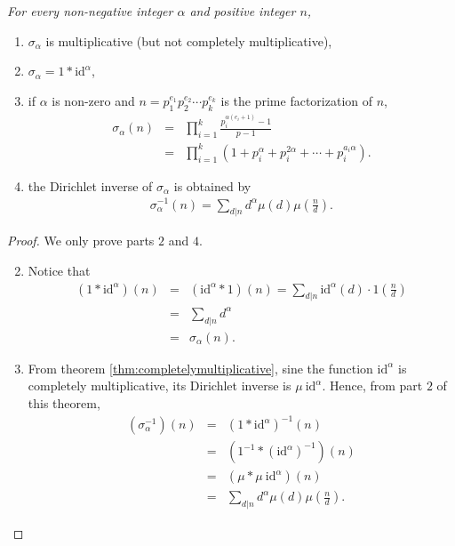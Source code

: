 \documentclass[12pt]{subfile}
\begin{document}
	\begin{theorem}\slshape
		For every non-negative integer $\alpha$ and positive integer $n$,
			\begin{enumerate}
				\item $\sigma_\alpha$ is multiplicative (but not completely multiplicative),
				\item $\sigma_\alpha = 1 \ast \text{id}^\alpha$,
				\item if $\alpha$ is non-zero and $n=p_1^{e_1}p_2^{e_2}\cdots p_k^{e_k}$ is the prime factorization of $n$,
					\begin{eqnarray*}
						\sigma_\alpha(n) &=& \prod_{i=1}^{k} \frac{p_i^{\alpha(e_i+1)}-1}{p-1}\\
									 &=& \prod_{i=1}^k \left(1 + p_i^\alpha + p_i^{2\alpha} + \cdots + p_i^{a_i \alpha}\right). 
					\end{eqnarray*}
				\item the Dirichlet inverse of $\sigma_\alpha$ is obtained by
					\begin{align*}
						\sigma_\alpha^{-1} (n) = \sum_{d|n} d^\alpha\mu(d) \mu\left(\frac{n}{d}\right).
					\end{align*}
			\end{enumerate}
	\end{theorem}
	
	\begin{proof}
		We only prove parts $2$ and $4$.
			\begin{enumerate} \setcounter{enumi}{1}
				\item Notice that
					\begin{eqnarray*}
						(1 \ast \text{id}^\alpha)(n) 
							&=& ( \text{id}^\alpha\ast 1)(n) = \sum_{d|n} \text{id}^\alpha (d) \cdot 1\left(\frac{n}{d}\right)\\
							&=& \sum_{d|n} d^\alpha \\
							&=& \sigma_\alpha (n).
					\end{eqnarray*}
				\setcounter{enumi}{3}
				\item From theorem \eqref{thm:completelymultiplicative}, sine the function $\text{id}^\alpha$ is completely multiplicative, its Dirichlet inverse is $\mu \ \text{id}^\alpha$. Hence, from part $2$ of this theorem,
					\begin{eqnarray*}
						(\sigma_\alpha^{-1})(n) 
									&=& \left(1 \ast \text{id}^\alpha\right)^{-1}(n)\\
									&=& \left(1^{-1} \ast  \left(\text{id}^\alpha\right)^{-1}\right)(n)\\
								    &=& \left(\mu \ast \mu \ \text{id}^\alpha\right)(n)\\
								    &=& \sum_{d|n} d^\alpha \mu(d) \mu\left(\frac{n}{d}\right).
					\end{eqnarray*}
			\end{enumerate}
	\end{proof}
\end{document}
